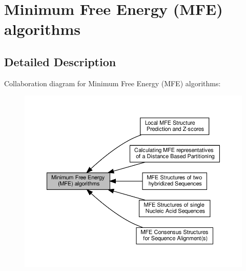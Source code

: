 \hypertarget{group__mfe__fold}{}\section{Minimum Free Energy (M\+FE) algorithms}
\label{group__mfe__fold}


\subsection{Detailed Description}
Collaboration diagram for Minimum Free Energy (M\+FE) algorithms\+:
\nopagebreak
\begin{figure}[H]
\begin{center}
\leavevmode
\includegraphics[width=350pt]{group__mfe__fold}
\end{center}
\end{figure}

